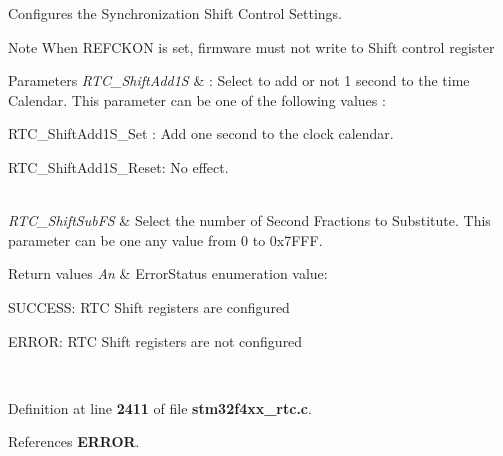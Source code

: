 Configures the Synchronization Shift Control Settings. 

\begin{DoxyNote}{Note}
When R\+E\+F\+C\+K\+ON is set, firmware must not write to Shift control register 
\end{DoxyNote}

\begin{DoxyParams}{Parameters}
{\em R\+T\+C\+\_\+\+Shift\+Add1S} & \+: Select to add or not 1 second to the time Calendar. This parameter can be one of the following values \+: \begin{DoxyItemize}
\item R\+T\+C\+\_\+\+Shift\+Add1\+S\+\_\+\+Set \+: Add one second to the clock calendar. \item R\+T\+C\+\_\+\+Shift\+Add1\+S\+\_\+\+Reset\+: No effect. \end{DoxyItemize}
\\
\hline
{\em R\+T\+C\+\_\+\+Shift\+Sub\+FS} & Select the number of Second Fractions to Substitute. This parameter can be one any value from 0 to 0x7\+F\+FF. \\
\hline
\end{DoxyParams}

\begin{DoxyRetVals}{Return values}
{\em An} & Error\+Status enumeration value\+:
\begin{DoxyItemize}
\item S\+U\+C\+C\+E\+SS\+: R\+TC Shift registers are configured
\item E\+R\+R\+OR\+: R\+TC Shift registers are not configured 
\end{DoxyItemize}\\
\hline
\end{DoxyRetVals}


Definition at line \textbf{ 2411} of file \textbf{ stm32f4xx\+\_\+rtc.\+c}.



References \textbf{ E\+R\+R\+OR}.


